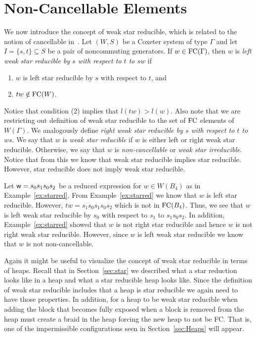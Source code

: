

\section{Non-Cancellable Elements}\label{sec:noncancel}
 
We now introduce the concept of weak star reducible, which is related to the notion of cancellable in~\cite{Fan1997}. Let $(W,S)$ be a Coxeter system of type $\Gamma$ and let $I=\{s,t\} \subseteq S$ be a pair of noncommuting generators. If $w  \in \mathrm{FC}(\Gamma)$, then $w$ is \emph{left weak star reducible by $s$ with respect to $t$ to $sw$} if
\begin{enumerate}[leftmargin=2cm]
\item $w$ is left star reducible by $s$ with respect to $t$, and
\item $tw \notin \mathrm{FC}(W)$.	
\end{enumerate}
Notice that condition (2) implies that $l(tw)>l(w)$. Also note that we are restricting out definition of weak star reducible to the set of $\mathrm{FC}$ elements of $W(\Gamma)$. We analogously define \emph{right weak star reducible by $s$ with respect to $t$ to $ws$}. We say that $w$ is \emph{weak star reducible} if $w$ is either left or right weak star reducible. Otherwise, we say that $w$ is \emph{non-cancellable} or \emph{weak star irreducible}. Notice that from this we know that weak star reducible implies star reducible. However, star reducible does not imply weak star reducible.

\begin{example}\label{ex:noncancel}
 Let $\mathsf{w}=s_0s_1s_0s_2$ be a reduced expression for $w \in W(B_4)$ as in Example~\ref{ex:starred}. From Example~\ref{ex:starred} we know that $w$ is left star reducible. However, $tw=s_1s_0s_1s_0s_2$ which is not in $\mathrm{FC}(B_4)$. Thus, we see that $w$ is left weak star reducible by $s_0$ with respect to $s_1$ to $s_1s_0s_2$. In addition, Example~\ref{ex:starred} showed that $w$ is not right star reducible and hence $w$ is not right weak star reducible. However, since $w$ is left weak star reducible we know that $w$ is not non-cancellable.
\end{example}

Again it might be useful to visualize the concept of weak star reducible in terms of heaps. Recall that in Section~\ref{sec:star} we described what a star reduction looks like in a heap and what a star reducible heap looks like. Since the definition of weak star reducible includes that a heap is star reducible we again need to have those properties. In addition, for a heap to be weak star reducible when adding the block that becomes fully exposed when a block is removed from the heap must create a braid in  the heap forcing the new heap to not be FC. That is, one of the impermissible configurations seen in Section~\ref{sec:Heaps} will appear.

